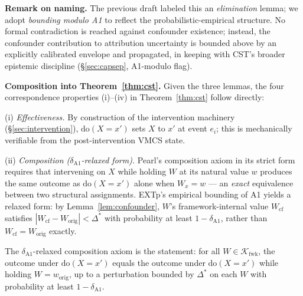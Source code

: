 \documentclass[conference]{IEEEtran}
\newcommand{\Kfwk}{\mathcal{K}_\text{fwk}}
\newcommand{\Dstar}{\Delta^{*}}
\newcommand{\dox}[1]{\text{do}(X{=}#1)}
\begin{document}
\textbf{Remark on naming.} The previous draft labeled this an
\emph{elimination} lemma; we adopt \emph{bounding modulo A1} to
reflect the probabilistic-empirical structure. No formal
contradiction is reached against confounder existence; instead,
the confounder contribution to attribution uncertainty is bounded
above by an explicitly calibrated envelope and propagated, in
keeping with CST's broader epistemic discipline
(\S\ref{sec:capsep}, A1-modulo flag).

\textbf{Composition into Theorem~\ref{thm:cst}.} Given the three
lemmas, the four correspondence properties (i)--(iv) in
Theorem~\ref{thm:cst} follow directly:

(i) \emph{Effectiveness.} By construction of the intervention
machinery (\S\ref{sec:intervention}), $\dox{x'}$ sets $X$ to
$x'$ at event $e_i$; this is mechanically verifiable from the
post-intervention VMCS state.

(ii) \emph{Composition ($\delta_{\text{A1}}$-relaxed form).}
Pearl's composition axiom in its strict form requires that
intervening on $X$ while holding $W$ at its natural value $w$
produces the same outcome as $\dox{x'}$ alone when $W_x = w$ ---
an \emph{exact} equivalence between two structural assignments.
EXTp's empirical bounding of A1 yields a relaxed form: by
Lemma~\ref{lem:confounder}, $W$'s framework-internal value
$W_{\text{cf}}$ satisfies $|W_{\text{cf}} - W_{\text{orig}}| <
\Dstar$ with probability at least $1 - \delta_{\text{A1}}$, rather
than $W_{\text{cf}} = W_{\text{orig}}$ exactly.

The $\delta_{\text{A1}}$-relaxed composition axiom is the
statement: for all $W \in \Kfwk$, the outcome under $\dox{x'}$
equals the outcome under $\dox{x'}$ while holding
$W = w_{\text{orig}}$, up to a perturbation bounded by $\Dstar$
on each $W$ with probability at least $1 - \delta_{\text{A1}}$.
\end{document}
